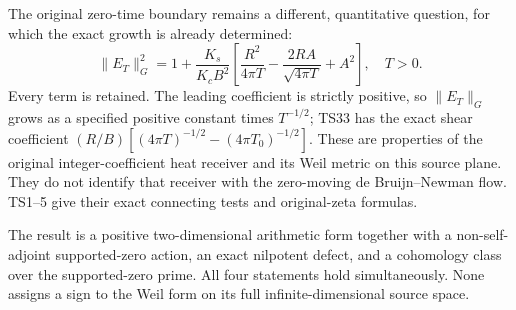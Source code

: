 The original zero-time boundary remains a different, quantitative
question, for which the exact growth is already determined:
\[
 \|E_T\|_G^2
 =1+\frac{K_s}{K_cB^2}
 \left[\frac{R^2}{4\pi T}
       -\frac{2RA}{\sqrt{4\pi T}}+A^2\right],\quad T>0.
 \tag{TS34}
\]
Every term is retained. The leading coefficient is strictly positive,
so \(\|E_T\|_G\) grows as a specified positive constant times
\(T^{-1/2}\); TS33 has the exact shear coefficient
\((R/B)[(4\pi T)^{-1/2}-(4\pi T_0)^{-1/2}]\).
These are properties of the original integer-coefficient heat
receiver and its Weil metric on this source plane. They do not
identify that receiver with the zero-moving de Bruijn--Newman flow.
TS1--5 give their exact connecting tests and original-zeta formulas.

The result is a positive two-dimensional arithmetic form together
with a non-self-adjoint supported-zero action, an exact nilpotent
defect, and a cohomology class over the supported-zero prime. All four
statements hold simultaneously. None assigns a sign to the Weil form
on its full infinite-dimensional source space.
